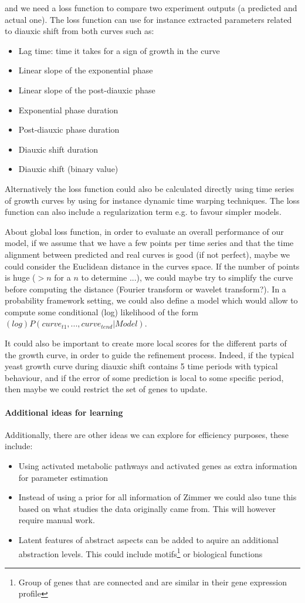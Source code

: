 \documentclass{article}
\begin{document}
and we need a loss function to compare two experiment outputs (a predicted and actual one).
The loss function can use for instance extracted parameters related to diauxic shift from both curves such as: 
\begin{itemize}
 \item Lag time: time it takes for a sign of growth in the curve
 \item Linear slope of the exponential phase
 \item Linear slope of the post-diauxic phase
 \item Exponential phase duration
 \item Post-diauxic phase duration
 \item Diauxic shift duration
 \item Diauxic shift (binary value)
\end{itemize}

Alternatively the loss function could also be calculated directly using time series of growth curves by using for instance 
dynamic time warping techniques. The loss function can also include a regularization term e.g. to favour simpler models.

About global loss function, in order to evaluate an overall performance of our model, if we assume that we have a few points per time series and that the time alignment between predicted and real curves is good (if not perfect), maybe we could consider the Euclidean distance in the curves space. If the number of points is huge ($>n$ for a $n$ to determine ...),
we could maybe try to simplify the curve before computing the distance (Fourier transform or wavelet transform?). In a probability framework setting, we could also define a model which would allow to compute some conditional (log) likelihood of the form $(log) P(curve_{t1}, ..., curve_{tend}|Model)$.

It could also be important to create more local scores for the different parts of the growth curve, in order to guide the refinement process. Indeed, if the typical yeast growth curve during diauxic shift contains 5 time periods with typical behaviour, and if the error of some prediction is local to some specific period, then maybe we could restrict the set of genes to update.
\paragraph{Additional ideas for learning}
Additionally, there are other ideas we can explore for efficiency purposes, these include:
\begin{itemize}
 \item Using activated metabolic pathways and activated genes as extra information for parameter estimation
 \item Instead of using a prior for all information of Zimmer we could also tune this based on what studies the data originally came from. This will however require manual work.
 \item Latent features of abstract aspects can be added to aquire an additional abstraction levels. This could include motifs\footnote{Group of genes that are connected and are similar in their gene expression profile} or biological functions
\end{itemize}
\end{document}
